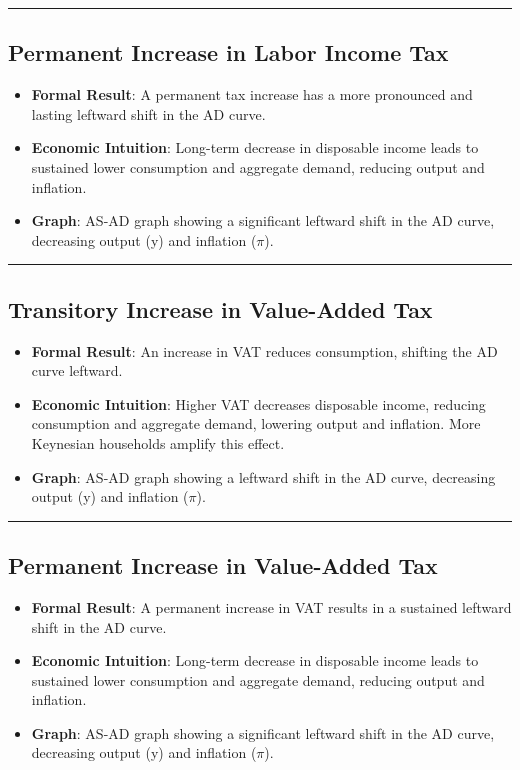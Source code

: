 \documentclass{article}
\begin{document}
\noindent\rule{\linewidth}{0.5pt}

\subsection{Permanent Increase in Labor Income Tax}
\begin{itemize}
    \item \textbf{Formal Result}: A permanent tax increase has a more pronounced and lasting leftward shift in the AD curve.
    \item \textbf{Economic Intuition}: Long-term decrease in disposable income leads to sustained lower consumption and aggregate demand, reducing output and inflation.
    \item \textbf{Graph}: AS-AD graph showing a significant leftward shift in the AD curve, decreasing output (y) and inflation (\(\pi \)).
\end{itemize}

\noindent\rule{\linewidth}{0.5pt}

\subsection{Transitory Increase in Value-Added Tax}
\begin{itemize}
    \item \textbf{Formal Result}: An increase in VAT reduces consumption, shifting the AD curve leftward.
    \item \textbf{Economic Intuition}: Higher VAT decreases disposable income, reducing consumption and aggregate demand, lowering output and inflation. More Keynesian households amplify this effect.
    \item \textbf{Graph}: AS-AD graph showing a leftward shift in the AD curve, decreasing output (y) and inflation (\(\pi \)).
\end{itemize}

\noindent\rule{\linewidth}{0.5pt}

\subsection{Permanent Increase in Value-Added Tax}
\begin{itemize}
    \item \textbf{Formal Result}: A permanent increase in VAT results in a sustained leftward shift in the AD curve.
    \item \textbf{Economic Intuition}: Long-term decrease in disposable income leads to sustained lower consumption and aggregate demand, reducing output and inflation.
    \item \textbf{Graph}: AS-AD graph showing a significant leftward shift in the AD curve, decreasing output (y) and inflation (\(\pi \)).
\end{itemize}
\end{document}
